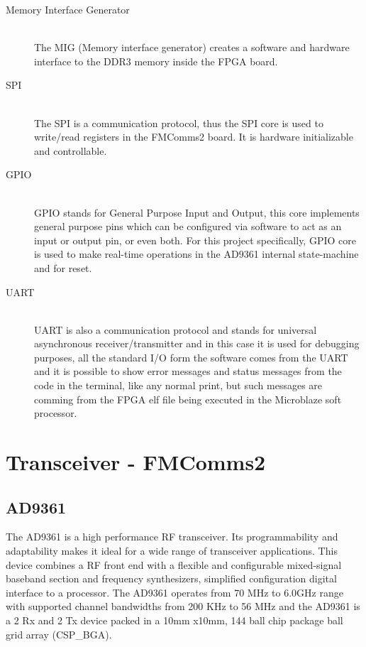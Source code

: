 \begin{description}
  \item[Memory Interface Generator] \hfill \\

  The MIG (Memory interface generator) creates a software and hardware interface
to the DDR3 memory inside the FPGA board.

  \item[SPI] \hfill \\

  The SPI is a communication protocol, thus the SPI core  is used to write/read
registers in the FMComms2 board. It is hardware initializable and controllable.

  \item[GPIO] \hfill \\

  GPIO stands for General Purpose Input and Output, this core implements general
purpose pins which can be configured via software to act as an input or output pin,
or even both. For this project specifically, GPIO core is used to make real-time
operations in the AD9361 internal state-machine and for reset.

  \item[UART] \hfill \\
  UART is also a communication protocol and stands for universal asynchronous
receiver/transmitter and in this case it is used for debugging purposes, all the
standard I/O form the software comes from the UART and it is possible to show
error messages and status messages from the code in the terminal, like any normal
print, but such messages are comming from the FPGA elf file being executed in the
Microblaze soft processor.

\end{description}


\section{Transceiver - FMComms2}
\subsection{AD9361}
\label{sec:ad9361}

The AD9361 is a high performance RF transceiver. Its programmability and
adaptability makes it ideal for a wide range of transceiver applications. This
device combines a RF front end with a flexible and configurable mixed-signal
baseband section and frequency synthesizers, simplified configuration digital
interface to a processor. The AD9361 operates from 70 MHz to 6.0GHz range with
supported channel bandwidths from 200 KHz to 56 MHz and the AD9361 is a 2 Rx and
2 Tx device packed in a 10mm x10mm, 144 ball chip package ball grid array
(CSP\_BGA).

